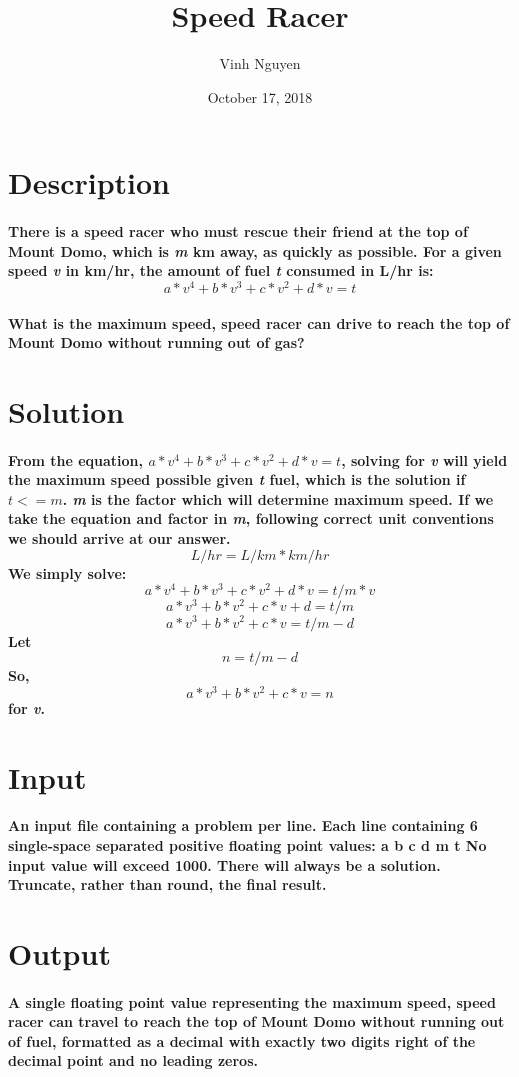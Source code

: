 \documentclass[12pt, oneside, a4paper]{article}
\begin{document}
\title{Speed Racer}
\author{Vinh Nguyen}
\date{October 17, 2018}
\maketitle
\newpage

\section*{Description}
	\paragraph{
		There is a speed racer who must rescue their friend at the top of Mount Domo,
		which is \emph{m} km away, as quickly as possible.  For a given speed 
		\emph{v} in km/hr, the amount of fuel \emph{t} consumed in L/hr is: 
		$$a*v^4 + b*v^3 + c*v^2 + d*v = t$$
	}
	\paragraph{
		What is the maximum speed, speed racer can drive to reach the top of Mount
		Domo without running out of gas?
	}
	
\section*{Solution}
	\paragraph{
		From the equation, $a*v^4 + b*v^3 + c*v^2 + d*v = t$, solving for \emph{v}
		will yield the maximum speed possible given \emph{t} fuel, which is the
		solution if $t <= m$.
		\hspace{0pt}
		\emph{m} is the factor which will determine maximum speed.  If we take the
		equation and factor in \emph{m}, following correct unit conventions we should
		arrive at our answer.
		$$L/hr = L/km * km/hr$$
		We simply solve: $$a*v^4 + b*v^3 + c*v^2 + d*v = t/m * v$$
						 $$a*v^3 + b*v^2 + c*v + d = t/m$$
						 $$a*v^3 + b*v^2 + c*v = t/m - d$$
						 Let $$n = t/m - d$$
						 So, $$a*v^3 + b*v^2 + c*v = n$$
		for \emph{v}.
	}
\newpage

\section*{Input}
	\paragraph{
		An input file containing a problem per line.\hspace{0pt}
		Each line containing 6 single-space separated positive floating point values:
		a b c d m t
		No input value will exceed 1000.  
		There will always be a solution.
		Truncate, rather than round, the final result.
	}	

\section*{Output}
	\paragraph{
		A single floating point value representing the maximum speed, speed racer can
		travel to reach the top of Mount Domo without running out of fuel, formatted
		as a decimal with exactly two digits right of the decimal point and no leading
		zeros.
	}
	
\end{document}
